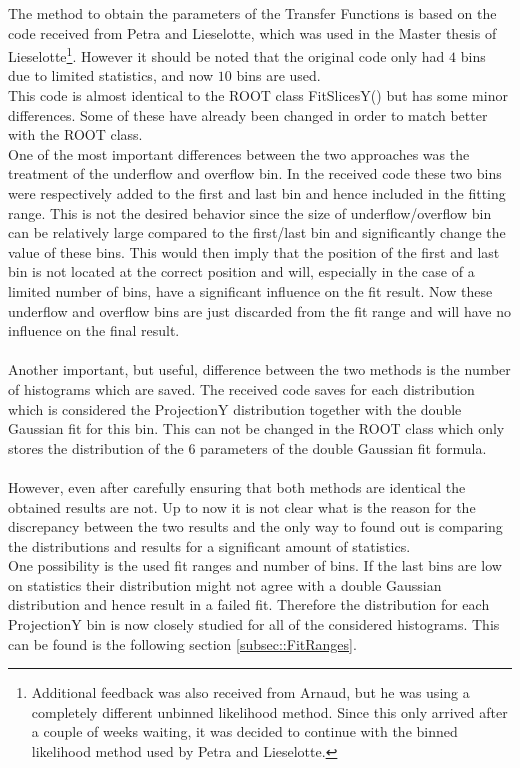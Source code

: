 The method to obtain the parameters of the Transfer Functions is based on the code received from Petra and Lieselotte, which was used in the Master thesis of Lieselotte\footnote{Additional feedback was also received from Arnaud, but he was using a completely different unbinned likelihood method. Since this only arrived after a couple of weeks waiting, it was decided to continue with the binned likelihood method used by Petra and Lieselotte.}. However it should be noted that the original code only had $4$ bins due to limited statistics, and now $10$ bins are used.\\
This code is almost identical to the ROOT class FitSlicesY() but has some minor differences. Some of these have already been changed in order to match better with the ROOT class.\\
One of the most important differences between the two approaches was the treatment of the underflow and overflow bin. In the received code these two bins were respectively added to the first and last bin and hence included in the fitting range. This is not the desired behavior since the size of underflow/overflow bin can be relatively large compared to the first/last bin and significantly change the value of these bins. This would then imply that the position of the first and last bin is not located at the correct position and will, especially in the case of a limited number of bins, have a significant influence on the fit result.
Now these underflow and overflow bins are just discarded from the fit range and will have no influence on the final result.\\
\\
Another important, but useful, difference between the two methods is the number of histograms which are saved. The received code saves for each distribution which is considered the ProjectionY distribution together with the double Gaussian fit for this bin. This can not be changed in the ROOT class which only stores the distribution of the 6 parameters of the double Gaussian fit formula.\\
\\
However, even after carefully ensuring that both methods are identical the obtained results are not.
Up to now it is not clear what is the reason for the discrepancy between the two results and the only way to found out is comparing the distributions and results for a significant amount of statistics.\\
One possibility is the used fit ranges and number of bins. If the last bins are low on statistics their distribution might not agree with a double Gaussian distribution and hence result in a failed fit. Therefore the distribution for each ProjectionY bin is now closely studied for all of the considered histograms. This can be found is the following section \ref{subsec::FitRanges}.

